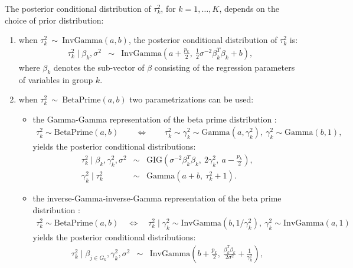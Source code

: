 \documentclass[nojss]{jss}
\begin{document}
The posterior conditional distribution of $\tau^2_k$, for $k=1, \ldots, K$,
depends on the choice of prior distribution:
\begin{enumerate}
	\item when $\tau^2_k \ \sim\  \mathrm{InvGamma}(a, b)$, the posterior
	conditional distribution of $\tau^{2}_k$ is:
  \begin{eqnarray*}
  		\tau_k^2\mid\beta_k,\sigma^2 &\sim&
  		\mathrm{InvGamma} \left( a + \frac{p_k}{2},\
  		\frac{1}{2}\sigma^{-2}\beta_{k}^T \beta_{k} + b  \right),
  \end{eqnarray*}
  where $\beta_k$ denotes the sub-vector of $\beta$ consisting of the regression
  parameters of variables in group $k$.
  \item when  $\tau^2_k \ \sim\  \mathrm{BetaPrime}(a, b)$ two parametrizations can be used:
  	\begin{itemize}
  	  \item the Gamma-Gamma representation of the beta prime distribution \citep{zhang2016}:
        \begin{eqnarray*}
        	\tau^2_k \sim \mathrm{BetaPrime}(a, b)
        	\qquad \Leftrightarrow \qquad
        	\tau^2_k \sim \gamma^2_k \sim \mathrm{Gamma}(a, \gamma^2_k),\ \gamma^2_k \sim \mathrm{Gamma}(b, 1),
        \end{eqnarray*}
  	      yields the posterior conditional distributions:
          \begin{eqnarray*}
          		\tau_k^2\mid\beta_k,\gamma_k^2,\sigma^2 &\sim& \mathrm{GIG}\left( \sigma^{-2} \beta_{k}^T \beta_{k},\ 2\gamma_k^2,\ a-\frac{p_k}{2} \right),\\
          		\gamma_k^2\mid\tau_k^2 &\sim& \mathrm{Gamma} \left( a + b,\ \tau_k^2 + 1 \right) .
          \end{eqnarray*}
  	  \item the inverse-Gamma-inverse-Gamma representation of the beta prime distribution \citep[Proposition 1]{schmidt2020}:
  	    \begin{eqnarray*}
  	      \tau_k^2 \sim \mathrm{BetaPrime}(a, b)\quad \Leftrightarrow \quad \tau_k^2 \mid \gamma_k^2 \sim \mathrm{InvGamma}(b, 1/\gamma_k^2),\ \gamma_k^2 \sim \mathrm{InvGamma}(a, 1)
        \end{eqnarray*}
        yields the posterior conditional distributions:
  	    \begin{eqnarray*}
          \tau_k^2\mid \beta_{j\in G_k}, \gamma_k^2, \sigma^2 &\sim& \mathrm{InvGamma} \left( b+\frac{p_k}{2},\ \frac{\beta_{k}^T \beta_{k}}{2 \sigma^2} + \frac{1}{\gamma_k^2} \right),\\

\end{eqnarray*}
\end{itemize}
\end{enumerate}
\end{document}
